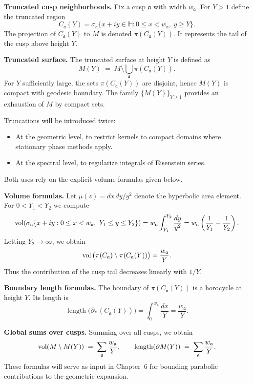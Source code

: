 \medskip
\noindent
\textbf{Truncated cusp neighborhoods.}
Fix a cusp $\mathfrak{a}$ with width $w_{\mathfrak{a}}$.
For $Y>1$ define the truncated region
\[
  C_{\mathfrak{a}}(Y)
  = \sigma_{\mathfrak{a}}
    \Big\{ x+iy \in \mathbb{H} : 0 \le x < w_{\mathfrak{a}},\ y \ge Y \Big\}.
\]
The projection of $C_{\mathfrak{a}}(Y)$ to $M$
is denoted $\pi(C_{\mathfrak{a}}(Y))$.
It represents the tail of the cusp above height $Y$.

\medskip
\noindent
\textbf{Truncated surface.}
The truncated surface at height $Y$ is defined as
\[
  M(Y) \;=\; M \setminus \bigcup_{\mathfrak{a}} \pi(C_{\mathfrak{a}}(Y)).
\]
For $Y$ sufficiently large, the sets $\pi(C_{\mathfrak{a}}(Y))$
are disjoint, hence $M(Y)$ is compact with geodesic boundary.
The family $\{M(Y)\}_{Y\ge1}$ provides an exhaustion of $M$ by compact sets.

\begin{remark}
Truncations will be introduced twice:
\begin{itemize}
  \item At the geometric level, to restrict kernels to compact domains
        where stationary phase methods apply.
  \item At the spectral level, to regularize integrals of Eisenstein series.
\end{itemize}
Both uses rely on the explicit volume formulas given below.
\end{remark}

\medskip
\noindent
\textbf{Volume formulas.}
Let $\mu(z)=dx\,dy/y^{2}$ denote the hyperbolic area element.
For $0<Y_{1}<Y_{2}$ we compute
\[
  \operatorname{vol}\!\left(
    \sigma_{\mathfrak{a}}
      \{ x+iy : 0\le x < w_{\mathfrak{a}},\ Y_{1} \le y \le Y_{2} \}
  \right)
  = w_{\mathfrak{a}} \int_{Y_{1}}^{Y_{2}} \frac{dy}{y^{2}}
  = w_{\mathfrak{a}}
    \left( \frac{1}{Y_{1}} - \frac{1}{Y_{2}} \right).
\]
Letting $Y_{2}\to\infty$, we obtain
\[
  \operatorname{vol}\big(\pi(C_{\mathfrak{a}}) \setminus \pi(C_{\mathfrak{a}}(Y))\big)
  = \frac{w_{\mathfrak{a}}}{Y}.
\]
Thus the contribution of the cusp tail decreases linearly with $1/Y$.

\medskip
\noindent
\textbf{Boundary length formulas.}
The boundary of $\pi(C_{\mathfrak{a}}(Y))$ is a horocycle at height $Y$.
Its length is
\[
  \operatorname{length}\big(\partial \pi(C_{\mathfrak{a}}(Y))\big)
  = \int_{0}^{w_{\mathfrak{a}}} \frac{dx}{Y}
  = \frac{w_{\mathfrak{a}}}{Y}.
\]

\medskip
\noindent
\textbf{Global sums over cusps.}
Summing over all cusps, we obtain
\[
  \operatorname{vol}(M \setminus M(Y)) \;=\; \sum_{\mathfrak{a}} \frac{w_{\mathfrak{a}}}{Y},
  \qquad
  \operatorname{length}(\partial M(Y)) \;=\; \sum_{\mathfrak{a}} \frac{w_{\mathfrak{a}}}{Y}.
\]
These formulas will serve as input in Chapter~6 for bounding
parabolic contributions to the geometric expansion.

